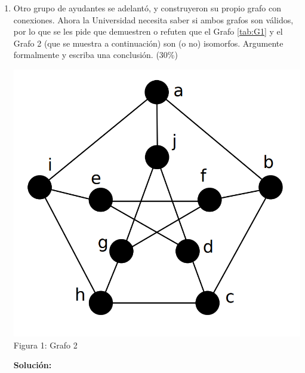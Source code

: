 \documentclass[letterpaper,10pt]{article}
\begin{document}
\begin{enumerate}
    
    \item Otro grupo de ayudantes se adelantó, y construyeron su propio grafo con conexiones. Ahora la Universidad necesita saber si ambos grafos son válidos, por lo que se les pide que demuestren o refuten que el Grafo \ref{tab:G1} y el Grafo 2 (que se muestra a continuación) son (o no) isomorfos. Argumente formalmente y escriba una conclusión. (30\%)
    \begin{center}
    \includegraphics[scale=0.25]{Screenshot_3.png}\\
    Figura 1: Grafo 2
    \end{center} 
    
    
\textbf{Solución:}

\end{enumerate}
\newpage
\end{document}
